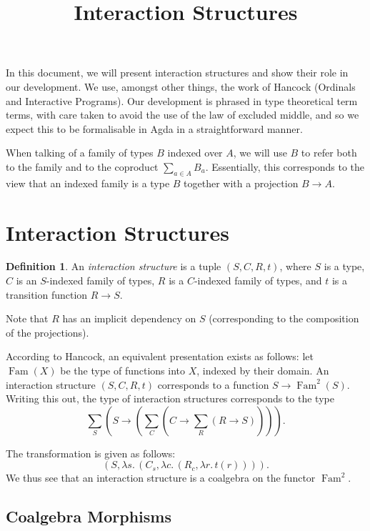 \documentclass{article}
\title{\vspace{-2cm}Interaction Structures}
\theoremstyle{definition}
\newtheorem{definition}[theorem]{Definition}
\DeclareMathOperator{\Fam}{Fam}
\begin{document}
    \maketitle

    In this document, we will present interaction structures and show their role in our development.  We use, amongst
    other things, the work of Hancock (Ordinals and Interactive Programs).  Our development is phrased in type
    theoretical term terms, with care taken to avoid the use of the law of excluded middle, and so we expect this to be
    formalisable in Agda in a straightforward manner.

    When talking of a family of types $B$ indexed over $A$, we will use $B$ to refer both to the family and to the
    coproduct $\sum_{a \in A} B_a$.  Essentially, this corresponds to the view that an indexed family is a type $B$
    together with a projection $B \to A$.

    \section{Interaction Structures}

    \begin{definition}
        An \emph{interaction structure} is a tuple $(S, C, R, t)$, where $S$ is a type, $C$ is an $S$-indexed family of
        types, $R$ is a $C$-indexed family of types, and $t$ is a transition function $R \to S$.
    \end{definition}

    Note that $R$ has an implicit dependency on $S$ (corresponding to the composition of the projections).

    According to Hancock, an equivalent presentation exists as follows: let $\Fam(X)$ be the type of functions into $X$,
    indexed by their domain. An interaction structure $(S, C, R, t)$ corresponds to a function $S \to \Fam^2(S)$.
    Writing this out, the type of interaction structures corresponds to the type
    \[
        \sum_S (S \to (\sum_C (C \to \sum_R (R \to S)))).
    \]

    The transformation is given as follows:
    \[
        (S, \lambda s.\, (C_s, \lambda c.\, (R_c, \lambda r.\, t(r)))).
    \]
    We thus see that an interaction structure is a coalgebra on the functor $\Fam^2$.

    \subsection{Coalgebra Morphisms}
\end{document}
